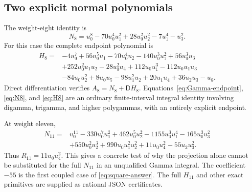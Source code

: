 \documentclass[11pt]{article}
\numberwithin{equation}{section}
\theoremstyle{definition}\newtheorem{definition}[theorem]{Definition}
\theoremstyle{remark}\newtheorem{remark}[theorem]{Remark}
\newcommand{\D}{\mathsf D}\newcommand{\Euler}{\mathscr E}
\begin{document}
\subsection{Two explicit normal polynomials}
The weight-eight identity is
\begin{equation}\label{eq:N8}
 N_8=u_0^8-70u_0^4u_1^2+28u_0^2u_2^2-7u_1^4-u_3^2.
\end{equation}
For this case the complete endpoint polynomial is
\begin{equation}\label{eq:H8}
\begin{split}
 H_8={}&-4u_0^7+56u_0^5u_1-70u_0^4u_2-140u_0^3u_1^2
       +56u_0^3u_3\\
 &+252u_0^2u_1u_2-28u_0^2u_4+112u_0u_1^3
       -112u_0u_1u_3\\
 &-84u_0u_2^2+8u_0u_5-98u_1^2u_2+20u_1u_4+36u_2u_3-u_6.
\end{split}
\end{equation}
Direct differentiation verifies $A_8=N_8+\D H_8$.
Equations~\eqref{eq:Gamma-endpoint}, \eqref{eq:N8}, and \eqref{eq:H8}
are an ordinary finite-interval integral identity involving digamma,
trigamma, and higher polygammas, with an entirely explicit endpoint.

At weight eleven,
\begin{equation}\label{eq:N11}
\begin{split}
 N_{11}={}&u_0^{11}-330u_0^7u_1^2+462u_0^5u_2^2
 -1155u_0^3u_1^4-165u_0^3u_3^2\\
 &+550u_0^2u_2^3+990u_0u_1^2u_2^2+11u_0u_4^2-55u_2u_3^2.
\end{split}
\end{equation}
Thus $R_{11}=11u_0u_4^2$. This gives a concrete test of why the
projection alone cannot be substituted for the full $N_{11}$ in an
unqualified Gamma integral. The coefficient $-55$ is the first coupled
case of \eqref{eq:square-answer}. The full $H_{11}$ and other exact
primitives are supplied as rational JSON certificates.
\end{document}

